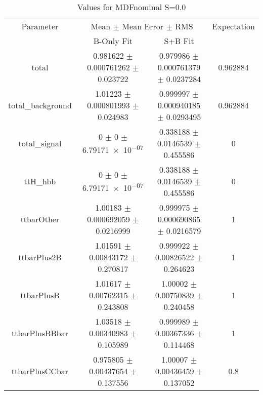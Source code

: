 \begin{table}
\centering
\caption{Values for MDFnominal S=0.0}
\begin{tabular}{cccc}
\toprule
Parameter & \multicolumn{2}{c}{Mean $\pm$ Mean Error $\pm$ RMS} & Expectation\\
 & B-Only Fit & S+B Fit & \\
\midrule
total & \num{0.981622} $\pm$ \num{0.000761262} $\pm$ \num{0.023722} & \num{0.979986} $\pm$ \num{0.000761379} $\pm$ \num{0.0237284} & \num{0.962884}\\
total\_background & \num{1.01223} $\pm$ \num{0.000801993} $\pm$ \num{0.024983} & \num{0.999997} $\pm$ \num{0.000940185} $\pm$ \num{0.0293495} & \num{0.962884}\\
total\_signal & \num{0} $\pm$ \num{0} $\pm$ \num{6.79171e-07} & \num{0.338188} $\pm$ \num{0.0146539} $\pm$ \num{0.455586} & \num{0}\\
ttH\_hbb & \num{0} $\pm$ \num{0} $\pm$ \num{6.79171e-07} & \num{0.338188} $\pm$ \num{0.0146539} $\pm$ \num{0.455586} & \num{0}\\
ttbarOther & \num{1.00183} $\pm$ \num{0.000692059} $\pm$ \num{0.0216999} & \num{0.999975} $\pm$ \num{0.000690865} $\pm$ \num{0.0216579} & \num{1}\\
ttbarPlus2B & \num{1.01591} $\pm$ \num{0.00843172} $\pm$ \num{0.270817} & \num{0.999922} $\pm$ \num{0.00826522} $\pm$ \num{0.264623} & \num{1}\\
ttbarPlusB & \num{1.01617} $\pm$ \num{0.00762315} $\pm$ \num{0.243808} & \num{1.00002} $\pm$ \num{0.00750839} $\pm$ \num{0.240458} & \num{1}\\
ttbarPlusBBbar & \num{1.03518} $\pm$ \num{0.00340983} $\pm$ \num{0.105989} & \num{0.999989} $\pm$ \num{0.00367336} $\pm$ \num{0.114468} & \num{1}\\
ttbarPlusCCbar & \num{0.975805} $\pm$ \num{0.00437654} $\pm$ \num{0.137556} & \num{1.00007} $\pm$ \num{0.00436459} $\pm$ \num{0.137052} & \num{0.8}\\
\bottomrule
\end{tabular}
\end{table}